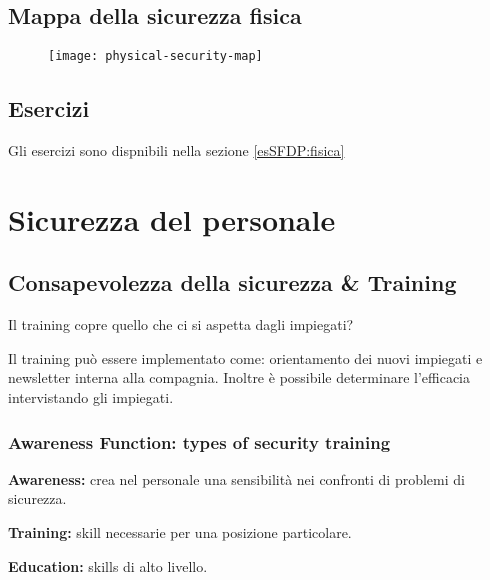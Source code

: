 \subsection{Mappa della sicurezza fisica}
\begin{figure}[H]
 \centering
 \texttt{[image: physical-security-map]}
\end{figure}

\subsection{Esercizi}

Gli esercizi sono dispnibili nella sezione \ref{esSFDP:fisica}

\section{Sicurezza del personale}

\subsection{Consapevolezza della sicurezza \& Training}

Il training copre quello che ci si aspetta dagli impiegati?

Il training può essere implementato come: orientamento dei nuovi impiegati e 
newsletter interna alla compagnia. Inoltre è possibile determinare l'efficacia 
intervistando gli impiegati.


\subsubsection{Awareness Function: types of security training}

\textbf{Awareness:} crea nel personale una sensibilità nei confronti di problemi di 
sicurezza.

\textbf{Training:} skill necessarie per una posizione particolare.

\textbf{Education:} skills di alto livello.
